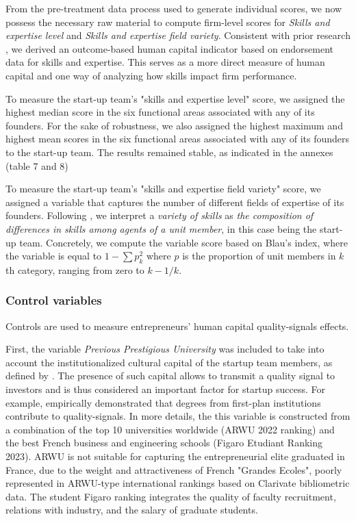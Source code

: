 \documentclass[12pt]{article}
\begin{document}
From the pre-treatment data process used to generate individual scores, we now possess the necessary raw material to compute firm-level scores for \textit{Skills and expertise level} and \textit{Skills and expertise field variety}. Consistent with prior research \citep{unger2011human, marvel2016human}, we derived an outcome-based human capital indicator based on endorsement data for skills and expertise. This serves as a more direct measure of human capital and one way of analyzing how skills impact firm performance.

To measure the start-up team's "skills and expertise level" score, we assigned the highest median score in the six functional areas associated with any of its founders. For the sake of robustness, we also assigned the highest maximum and highest mean scores in the six functional areas associated with any of its founders to the start-up team. The results remained stable, as indicated in the annexes (table 7 and 8)

To measure the start-up team's "skills and expertise field variety" score, we assigned a variable that captures the number of different fields of expertise of its founders. Following \citet{harrison2007s}, we interpret a \textit{variety of skills} as \textit{the composition of differences in skills among agents of a unit member}, in this case being the start-up team. Concretely, we compute the variable score based on Blau's index, where the variable is equal to $1-\sum p_k^2$ where $p$ is the proportion of unit members in $k$th category, ranging from zero to $k-1/k$.

\subsubsection{Control variables}

Controls are used to measure entrepreneurs' human capital quality-signals effects.

First, the variable \textit{Previous Prestigious University} was included to take into account the institutionalized cultural capital of the startup team members, as defined by \citet{bourdieu1979distinction}. The presence of such capital allows to transmit a quality signal to investors and is thus considered an important factor for startup success. For example, \citet{ferrary1999confiance} empirically demonstrated that degrees from first-plan institutions contribute to quality-signals. In more details, the this variable is constructed from a combination of the top 10 universities worldwide (ARWU 2022 ranking) and the best French business and engineering schools (Figaro Etudiant Ranking 2023). ARWU is not suitable for capturing the entrepreneurial elite graduated in France, due to the weight and attractiveness of French "Grandes Ecoles", poorly represented in ARWU-type international rankings based on Clarivate bibliometric data. The student Figaro ranking integrates the quality of faculty recruitment, relations with industry, and the salary of graduate students.
\end{document}
